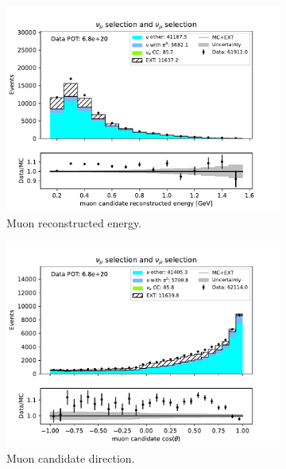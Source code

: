 \begin{figure}[H]
    \centering
    \begin{subfigure}{0.33\linewidth}
        \includegraphics[width=\linewidth]{technote/Sidebands/Figures/NuMuSideband/muon_sideband_muon_energy_run123_NUMU_NUMU.pdf}
        \caption{Muon reconstructed energy.}
    \end{subfigure}%
    \begin{subfigure}{0.33\linewidth}
        \includegraphics[width=\linewidth]{technote/Sidebands/Figures/NuMuSideband/muon_sideband_muon_theta_run123_NUMU_NUMU.pdf}
        \caption{Muon candidate direction.}
    \end{subfigure}%
    \begin{subfigure}{0.33\linewidth}

\end{subfigure}
\end{figure}
